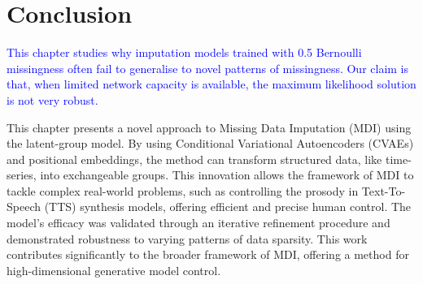 \documentclass[a4paper,12pt,twoside,openright]{article}
\newcommand{\crit}[1]{\textcolor{red}{#1}}
\newcommand{\draft}[1]{\textcolor{blue}{#1}}
\begin{document}

\section{Conclusion} 

\draft{This chapter studies why imputation models trained with 0.5 Bernoulli missingness often fail to generalise to novel patterns of missingness. Our claim is that, when limited network capacity is available, the maximum likelihood solution is not very robust.}

This chapter presents a novel approach to Missing Data Imputation (MDI) using the latent-group model. By using Conditional Variational Autoencoders (CVAEs) and positional embeddings, the method can transform structured data, like time-series, into exchangeable groups. This innovation allows the framework of MDI to tackle complex real-world problems, such as controlling the prosody in Text-To-Speech (TTS) synthesis models, offering efficient and precise human control. The model's efficacy was validated through an iterative refinement procedure and demonstrated robustness to varying patterns of data sparsity. This work contributes significantly to the broader framework of MDI, offering a method for high-dimensional generative model control.




\end{document}
